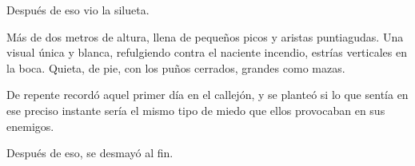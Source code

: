 Después de eso vio la silueta.

Más de dos metros de altura, llena de pequeños picos y aristas puntiagudas. Una visual única y blanca, refulgiendo contra el naciente incendio, estrías verticales en la boca. Quieta, de pie, con los puños cerrados, grandes como mazas.

De repente recordó aquel primer día en el callejón, y se planteó si lo que sentía en ese preciso instante sería el mismo tipo de miedo que ellos provocaban en sus enemigos.

Después de eso, se desmayó al fin.

\endinput
